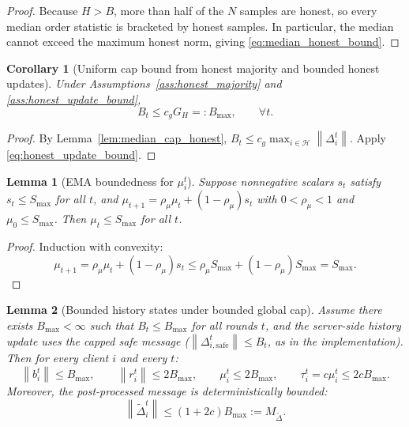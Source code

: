 \documentclass[11pt,a4paper]{article}
\newtheorem{lemma}{Lemma}
\newtheorem{corollary}{Corollary}
\theoremstyle{remark}
\newcommand{\HH}{\mathcal{H}}
\newcommand{\norm}[1]{\left\lVert #1 \right\rVert}
\begin{document}
\begin{proof}
Because \(H>B\), more than half of the \(N\) samples are honest, so every
median order statistic is bracketed by honest samples. In particular, the
median cannot exceed the maximum honest norm, giving
\eqref{eq:median_honest_bound}.
\end{proof}

\begin{corollary}[Uniform cap bound from honest majority and bounded honest updates]
\label{cor:Bmax_from_honest}
Under Assumptions~\ref{ass:honest_majority} and
\ref{ass:honest_update_bound},
\begin{equation}
    B_t
    \le
    c_g G_H
    =: B_{\max},
    \qquad \forall t.
    \label{eq:Bmax_from_honest}
\end{equation}
\end{corollary}

\begin{proof}
By Lemma~\ref{lem:median_cap_honest},
\(
B_t\le c_g\max_{i\in\HH}\norm{\Delta_i^t}
\).
Apply \eqref{eq:honest_update_bound}.
\end{proof}

\begin{lemma}[EMA boundedness for \(\mu_i^t\)]
\label{lem:mu_ema_bounded}
Suppose nonnegative scalars \(s_t\) satisfy \(s_t\le S_{\max}\) for all \(t\),
and \(\mu_{t+1}=\rho_\mu\mu_t+(1-\rho_\mu)s_t\) with \(0<\rho_\mu<1\) and
\(\mu_0\le S_{\max}\). Then \(\mu_t\le S_{\max}\) for all \(t\).
\end{lemma}

\begin{proof}
Induction with convexity:
\[
    \mu_{t+1}
    =
    \rho_\mu\mu_t+(1-\rho_\mu)s_t
    \le
    \rho_\mu S_{\max}+(1-\rho_\mu)S_{\max}
    =
    S_{\max}.
\]
\end{proof}

\begin{lemma}[Bounded history states under bounded global cap]
\label{lem:mu_tau_bounded}
Assume there exists \(B_{\max}<\infty\) such that \(B_t\le B_{\max}\) for all
rounds \(t\), and the server-side history update uses the capped safe message
(\(\norm{\Delta_{i,\mathrm{safe}}^t}\le B_t\), as in the implementation).
Then for every client \(i\) and every \(t\):
\begin{equation}
    \norm{b_i^t}\le B_{\max},
    \qquad
    \norm{r_i^t}\le 2B_{\max},
    \qquad
    \mu_i^t\le 2B_{\max},
    \qquad
    \tau_i^t=c\mu_i^t\le 2cB_{\max}.
    \label{eq:mu_tau_bounds}
\end{equation}
Moreover, the post-processed message is deterministically bounded:
\begin{equation}
    \norm{\tilde\Delta_i^t}\le (1+2c)B_{\max} := M_{\tilde\Delta}.
    \label{eq:tilde_delta_det_bound}
\end{equation}
\end{lemma}
\end{document}
